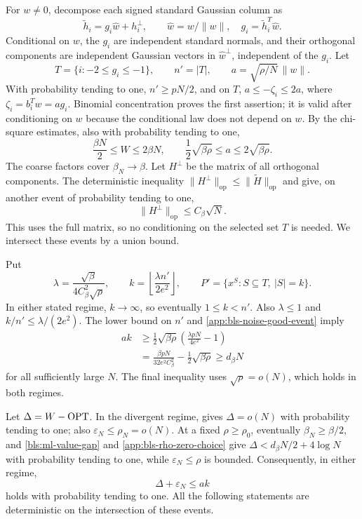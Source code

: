 For $w\ne0$, decompose each signed standard Gaussian column as
\[
 \widetilde h_i=g_i\widehat w+h_i^\perp,
 \qquad \widehat w=w/\|w\|,
 \quad g_i=\widetilde h_i^T\widehat w.
\]
Conditional on $w$, the $g_i$ are independent standard normals, and their
orthogonal components are independent Gaussian vectors in
$\widehat w^\perp$, independent of the $g_i$.
Let
\[
 T=\{i:-2\le g_i\le-1\},\qquad n'=|T|,
 \qquad a=\sqrt{\rho/N}\,\|w\|.
\]
With probability tending to one, $n'\ge pN/2$, and on $T$,
$a\le-\zeta_i\le2a$, where $\zeta_i=b_i^Tw=ag_i$.
Binomial concentration proves the first assertion; it is valid after
conditioning on $w$ because the conditional law does not depend on $w$.
By the chi-square estimates, also with probability tending to one,
\begin{equation}
 \frac{\beta N}{2}\le W\le2\beta N,
 \qquad \frac12\sqrt{\beta\rho}\le a\le2\sqrt{\beta\rho}.
 \label{app:bls-noise-good-event}
\end{equation}
The coarse factors cover $\beta_N\to\beta$.
Let $H^\perp$ be the matrix of all orthogonal components.  The
deterministic inequality
$\|H^\perp\|_{\mathrm{op}}\le\|\widetilde H\|_{\mathrm{op}}$ and
 give, on another event of probability
tending to one,
\begin{equation}
 \|H^\perp\|_{\mathrm{op}}\le C_\beta\sqrt N.
 \label{app:bls-perpendicular-operator}
\end{equation}
This uses the full matrix, so no conditioning on the selected set $T$ is
needed.  We intersect these events by a union bound.

Put
\begin{equation}
 \lambda=\frac{\sqrt\beta}{4C_\beta^2\sqrt\rho},\qquad
 k=\left\lfloor\frac{\lambda n'}{2e^2}\right\rfloor,
 \qquad
 P'=\{x^S:S\subseteq T,\ |S|=k\}.
 \label{app:bls-selected-vertices}
\end{equation}
In either stated regime, $k\to\infty$, so eventually $1\le k<n'$.
Also $\lambda\le1$ and $k/n'\le\lambda/(2e^2)$.
The lower bound on $n'$ and \eqref{app:bls-noise-good-event} imply
\begin{align*}
 ak&\ge\frac12\sqrt{\beta\rho}
       \left(\frac{\lambda pN}{4e^2}-1\right)\\
   &=\frac{\beta pN}{32e^2C_\beta^2}
       -\frac12\sqrt{\beta\rho}\ge d_\beta N
\end{align*}
for all sufficiently large $N$.  The final inequality uses
$\sqrt\rho=o(N)$, which holds in both regimes.

Let $\Delta=W-\operatorname{OPT}$.  In the divergent regime,
 gives $\Delta=o(N)$ with probability tending to one;
also $\varepsilon_N\le\rho_N=o(N)$.
At a fixed $\rho\ge\rho_0$, eventually $\beta_N\ge\beta/2$, and
\eqref{bls:ml-value-gap} and \eqref{app:bls-rho-zero-choice} give
$\Delta<d_\beta N/2+4\log N$ with probability tending to one, while
$\varepsilon_N\le\rho$ is bounded.  Consequently, in either regime,
\begin{equation}
 \Delta+\varepsilon_N\le ak
 \label{app:bls-gap-paid}
\end{equation}
holds with probability tending to one.  All the following statements are
deterministic on the intersection of these events.

